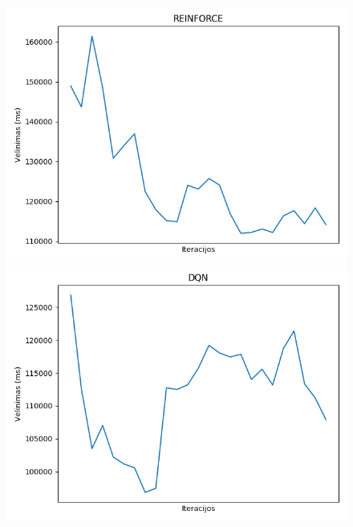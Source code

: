 \documentclass{VUMIFPSbakalaurinis}
\begin{document}
\begin{figure}[H]
    \centering
    \begin{minipage}[b]{0.4\textwidth}
        \includegraphics[width=\textwidth]{img/reinforce_250.png}
    \end{minipage}
    \hspace{100mm}
    \begin{minipage}[b]{0.4\textwidth}
        \includegraphics[width=\textwidth]{img/dqn_250.png}
    \end{minipage}
    \hspace{1mm}
    \begin{minipage}[b]{0.4\textwidth}

\end{minipage}
\end{figure}
\end{document}
